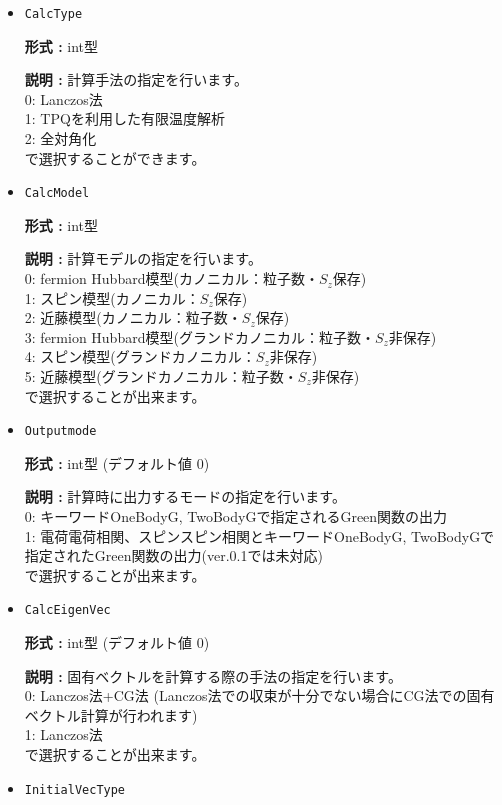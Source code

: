 \begin{itemize}
\item  \verb|CalcType|

{\bf 形式 :} int型 

{\bf 説明 :} 計算手法の指定を行います。\\
0: Lanczos法\\
1: TPQを利用した有限温度解析\\
2: 全対角化\\
で選択することができます。

\item  \verb|CalcModel|

{\bf 形式 :} int型 

{\bf 説明 :} 計算モデルの指定を行います。\\
0: fermion Hubbard模型(カノニカル：粒子数・$S_z$保存)\\
1: スピン模型(カノニカル：$S_z$保存)\\
2: 近藤模型(カノニカル：粒子数・$S_z$保存)\\
3: fermion Hubbard模型(グランドカノニカル：粒子数・$S_z$非保存)\\
4: スピン模型(グランドカノニカル：$S_z$非保存)\\
5: 近藤模型(グランドカノニカル：粒子数・$S_z$非保存)\\
で選択することが出来ます。

\item  \verb|Outputmode|

{\bf 形式 :} int型 (デフォルト値 0)

{\bf 説明 :} 計算時に出力するモードの指定を行います。\\
0: キーワードOneBodyG, TwoBodyGで指定されるGreen関数の出力\\
1: 電荷電荷相関、スピンスピン相関とキーワードOneBodyG, TwoBodyGで指定されたGreen関数の出力(ver.0.1では未対応)\\
で選択することが出来ます。

\item  \verb|CalcEigenVec|

{\bf 形式 :} int型 (デフォルト値 0)

{\bf 説明 :} 固有ベクトルを計算する際の手法の指定を行います。\\
0: Lanczos法+CG法 (Lanczos法での収束が十分でない場合にCG法での固有ベクトル計算が行われます)\\
1: Lanczos法\\
で選択することが出来ます。

\item  \verb|InitialVecType|


\end{itemize}
